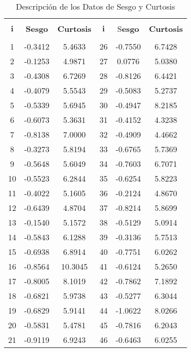 
\begin{table}[!htbp] 
{\centering 
\setlength\extrarowheight{-1pt}
\setlength{\tabcolsep}{6pt} %
\captionsetup{justification=centering}
\captionsetup{labelsep = colon}
  \caption{Descripción de los Datos de Sesgo y Curtosis} 
  \label{AnexoCuandro1} 
{
\begin{tabular}{@{\extracolsep{5pt}} cccccc} 
\\[-1.8ex]\hline 
\hline \\[-1.8ex] 
$\boldsymbol{i}$ & \textbf{Sesgo} & \textbf{Curtosis} & $\boldsymbol{i}$ & S\textbf{esgo} & \textbf{Curtosis} \\ 
\hline \\[-1.8ex] 
1 & -0.3412 & 5.4633 & 26 & -0.7550 & 6.7428 \\ 
2 & -0.1253 & 4.9871 & 27 & 0.0776 & 5.0380 \\ 
3 & -0.4308 & 6.7269 & 28 & -0.8126 & 6.4421 \\ 
4 & -0.4079 & 5.5543 & 29 & -0.5083 & 5.2737 \\ 
5 & -0.5339 & 5.6945 & 30 & -0.4947 & 8.2185 \\ 
6 & -0.6073 & 5.3631 & 31 & -0.4152 & 4.3238 \\ 
7 & -0.8138 & 7.0000 & 32 & -0.4909 & 4.4662 \\ 
8 & -0.3273 & 5.8194 & 33 & -0.6765 & 5.7369 \\ 
9 & -0.5648 & 5.6049 & 34 & -0.7603 & 6.7071 \\ 
10 & -0.5523 & 6.2844 & 35 & -0.6254 & 5.8223 \\ 
11 & -0.4022 & 5.1605 & 36 & -0.2124 & 4.8670 \\ 
12 & -0.6439 & 4.8704 & 37 & -0.8214 & 5.8699 \\ 
13 & -0.1540 & 5.1572 & 38 & -0.5129 & 5.0914 \\ 
14 & -0.5843 & 6.1288 & 39 & -0.3136 & 5.7513 \\ 
15 & -0.6938 & 6.8914 & 40 & -0.7751 & 6.0262 \\ 
16 & -0.8564 & 10.3045 & 41 & -0.6124 & 5.2650 \\ 
17 & -0.8005 & 8.1019 & 42 & -0.7862 & 7.1892 \\ 
18 & -0.6821 & 5.9738 & 43 & -0.5277 & 6.3044 \\ 
19 & -0.6829 & 5.9141 & 44 & -1.0622 & 8.0266 \\ 
20 & -0.5831 & 5.4781 & 45 & -0.7816 & 6.2043 \\ 
21 & -0.9119 & 6.9243 & 46 & -0.6463 & 6.0255 \\ 

\end{tabular}}}
\end{table}
